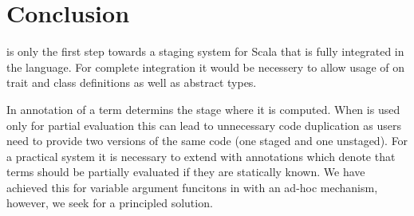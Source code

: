 \section{Conclusion}
\label{sct:conclusion}

\tool is only the first step towards a staging system for Scala that is fully integrated in the language. For
 complete integration it would be necessery to allow usage of  on trait and class definitions
 as well as abstract types.

In \tool annotation of a term determins the stage where it is computed. When \tool is used only for partial evaluation
 this can lead to unnecessary code duplication as users need to provide two versions of the same
 code (one staged and one unstaged). For a practical system it is necessary to extend \tool with
 annotations which denote that terms should be partially evaluated if they are statically known.
 We have achieved this for variable argument funcitons in  with an ad-hoc mechanism,
 however, we seek for a principled solution.
